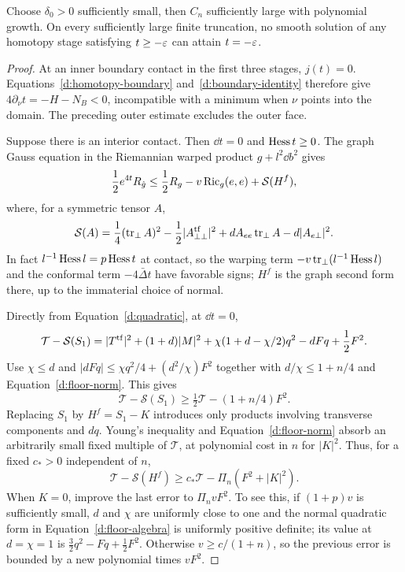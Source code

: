 \begin{lemma}\label{d:floor}
Choose $\delta_0>0$ sufficiently small, then $C_n$ sufficiently large
with polynomial growth.  On every sufficiently large finite
truncation, no smooth solution of any homotopy stage satisfying
$t\ge-\varepsilon$ can attain $t=-\varepsilon$.
\end{lemma}
\begin{proof}
At an inner boundary contact in the first three stages, $j(t)=0$.
Equations~\eqref{d:homotopy-boundary} and~\eqref{d:boundary-identity}
therefore give
$4\partial_\nu t=-H-N_B<0$, incompatible with a minimum when $\nu$
points into the domain.  The preceding outer estimate excludes the
outer face.

Suppose there is an interior contact.  Then $\dd t=0$ and
$\operatorname{Hess} t\ge0$.  The graph Gauss equation in the Riemannian warped
product $g+l^2\dd b^2$ gives
\begin{equation}\label{d:floor-gauss}
 \frac12e^{4t}R_{\hat g}
 \le\frac12R_g-v\operatorname{Ric}_g(e,e)+\mathcal S(H^f),
\end{equation}
where, for a symmetric tensor $A$,
\[
 \mathcal S(A)=\frac14(\operatorname{tr}_\perp A)^2
 -\frac12|A_{\perp\perp}^{\rm tf}|^2
 +dA_{ee}\operatorname{tr}_\perp A-d|A_{e\perp}|^2.
\]
In fact $l^{-1}\operatorname{Hess} l=p\operatorname{Hess} t$ at contact, so the warping term
$-v\operatorname{tr}_\perp(l^{-1}\operatorname{Hess} l)$ and the conformal term
$-4\bar\Delta t$ have favorable signs; $H^f$ is the graph second
form there, up to the immaterial choice of normal.

Directly from Equation~\eqref{d:quadratic}, at $\dd t=0$,
\begin{equation}\label{d:floor-algebra}
 \mathcal T-\mathcal S(S_1)
 =|T^{\rm tf}|^2+(1+d)|M|^2
  +\chi(1+d-\chi/2)q^2-dFq+\frac12F^2.
\end{equation}
Use $\chi\le d$ and
$|dFq|\le\chi q^2/4+(d^2/\chi)F^2$ together with
$d/\chi\le1+n/4$ and Equation~\eqref{d:floor-norm}.  This gives
\[
 \mathcal T-\mathcal S(S_1)
 \ge\tfrac12\mathcal T-(1+n/4)F^2.
\]
Replacing $S_1$ by $H^f=S_1-K$ introduces only products involving
transverse components and $dq$.  Young's inequality and
Equation~\eqref{d:floor-norm} absorb an arbitrarily small fixed multiple
of $\mathcal T$, at polynomial cost in $n$ for $|K|^2$.  Thus, for a
fixed $c_*>0$ independent of $n$,
\begin{equation}\label{d:floor-coercivity}
 \mathcal T-\mathcal S(H^f)
       \ge c_*\mathcal T-\Pi_n(F^2+|K|^2).
\end{equation}
When $K=0$, improve the last error to $\Pi_n vF^2$.  To see this,
if $(1+p)v$ is sufficiently small, $d$ and $\chi$ are uniformly
close to one and the normal quadratic form in
Equation~\eqref{d:floor-algebra} is uniformly positive definite; its
value at $d=\chi=1$ is $\frac32q^2-Fq+\frac12F^2$.
Otherwise $v\ge c/(1+n)$, so the previous error is bounded by a new
polynomial times $vF^2$.


\end{proof}
